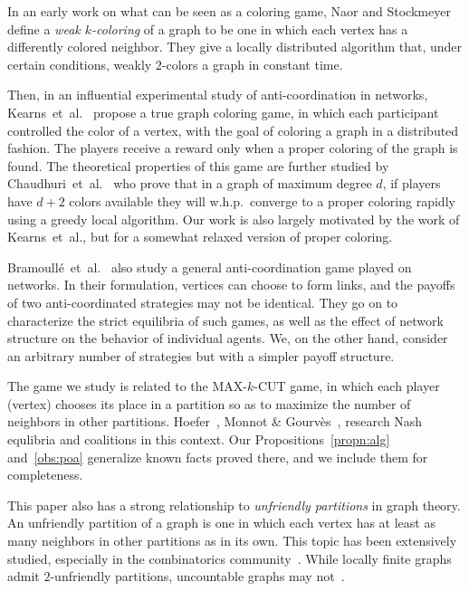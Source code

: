 \documentclass{llncs}
\begin{document}
In an early work on what can be seen as a coloring game, Naor and
Stockmeyer~\cite{NaorS93} define a \emph{weak $k$-coloring} of a graph to be
one in which each vertex has a differently colored neighbor.
They give a locally distributed algorithm that, under certain
conditions, weakly $2$-colors a graph in constant time.

Then, in an influential experimental study of anti-coordination in networks,
Kearns~et~al.~\cite{KearnsSM06} propose a true graph coloring game, in which
each participant controlled the color of a vertex, with the goal of coloring a
graph in a distributed fashion.  The players receive a reward only when a
proper coloring of the graph is found.  The theoretical properties of this
game are further studied by Chaudhuri~et~al.~\cite{ChaudhuriGJ08} who prove
that in a graph of maximum degree $d$, if players have $d + 2$ colors available
they will w.h.p.\ converge to a proper coloring rapidly using a greedy local
algorithm.  Our work is also largely motivated by the work of Kearns~et~al.,
but for a somewhat relaxed version of proper coloring.

Bramoull\'{e}~et~al.~\cite{BramoulleLGV04} also study a general
anti-coordination game played on networks.  In their formulation, vertices can
choose to form links, and the payoffs of two anti-coordinated strategies
may not be identical.  They go on to characterize the strict equilibria of such
games, as well as the effect of network structure on the behavior of individual
agents.  We, on the other hand, consider an arbitrary number of strategies but
with a simpler payoff structure.

The game we study is related to the MAX-$k$-CUT game, in which
each player (vertex) chooses its place in a partition so as to maximize the
number of neighbors in other partitions. Hoefer~\cite{Hoefer2007}, Monnot \&
Gourv\`es~\cite{G09}, research Nash equlibria and coalitions in this
context. Our Propositions~\ref{propn:alg} and~\ref{obs:poa} generalize known
facts proved there, and we include them for completeness.

This paper also has a strong relationship to \emph{unfriendly
partitions} in graph theory.  An unfriendly partition of a graph is one in
which each vertex has at least as many neighbors in other partitions as in its
own.  This topic has been extensively studied, especially in the combinatorics
community~\cite{AharoniMP90,BruhnDGS10,CowanE,ShelahM90}.
While locally finite graphs admit $2$-unfriendly partitions, uncountable graphs
may not~\cite{ShelahM90}.
\end{document}
